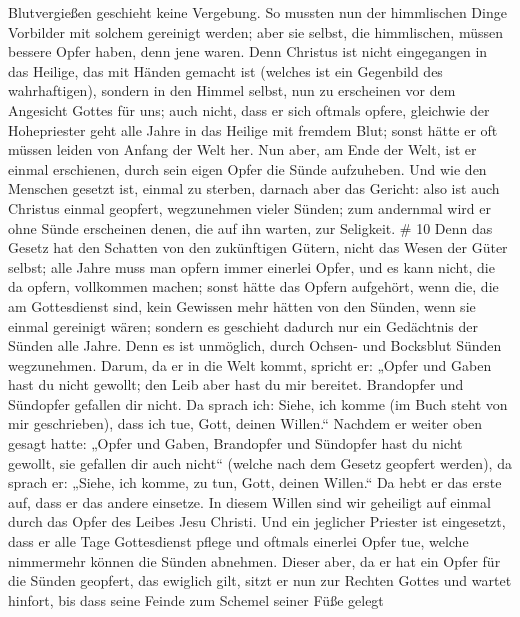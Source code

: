 Blutvergießen geschieht keine Vergebung.  So mussten nun
der himmlischen Dinge Vorbilder mit solchem gereinigt werden; aber sie
selbst, die himmlischen, müssen bessere Opfer haben, denn jene waren.
 Denn Christus ist nicht eingegangen in das Heilige, das
mit Händen gemacht ist (welches ist ein Gegenbild des wahrhaftigen),
sondern in den Himmel selbst, nun zu erscheinen vor dem Angesicht Gottes
für uns;  auch nicht, dass er sich oftmals opfere,
gleichwie der Hohepriester geht alle Jahre in das Heilige mit fremdem
Blut;  sonst hätte er oft müssen leiden von Anfang der Welt
her. Nun aber, am Ende der Welt, ist er einmal erschienen, durch sein
eigen Opfer die Sünde aufzuheben.  Und wie den Menschen
gesetzt ist, einmal zu sterben, darnach aber das Gericht: 
also ist auch Christus einmal geopfert, wegzunehmen vieler Sünden; zum
andernmal wird er ohne Sünde erscheinen denen, die auf ihn warten, zur
Seligkeit. \# 10  Denn das Gesetz hat den Schatten von den
zukünftigen Gütern, nicht das Wesen der Güter selbst; alle Jahre muss
man opfern immer einerlei Opfer, und es kann nicht, die da opfern,
vollkommen machen;  sonst hätte das Opfern aufgehört, wenn
die, die am Gottesdienst sind, kein Gewissen mehr hätten von den Sünden,
wenn sie einmal gereinigt wären;  sondern es geschieht
dadurch nur ein Gedächtnis der Sünden alle Jahre.  Denn es
ist unmöglich, durch Ochsen- und Bocksblut Sünden wegzunehmen.
 Darum, da er in die Welt kommt, spricht er: „Opfer und
Gaben hast du nicht gewollt; den Leib aber hast du mir bereitet.
 Brandopfer und Sündopfer gefallen dir nicht. 
Da sprach ich: Siehe, ich komme (im Buch steht von mir geschrieben),
dass ich tue, Gott, deinen Willen.``  Nachdem er weiter oben
gesagt hatte: „Opfer und Gaben, Brandopfer und Sündopfer hast du nicht
gewollt, sie gefallen dir auch nicht`` (welche nach dem Gesetz geopfert
werden),  da sprach er: „Siehe, ich komme, zu tun, Gott,
deinen Willen.`` Da hebt er das erste auf, dass er das andere einsetze.
 In diesem Willen sind wir geheiligt auf einmal durch das
Opfer des Leibes Jesu Christi.  Und ein jeglicher Priester
ist eingesetzt, dass er alle Tage Gottesdienst pflege und oftmals
einerlei Opfer tue, welche nimmermehr können die Sünden abnehmen.
 Dieser aber, da er hat ein Opfer für die Sünden geopfert,
das ewiglich gilt, sitzt er nun zur Rechten Gottes  und
wartet hinfort, bis dass seine Feinde zum Schemel seiner Füße gelegt
